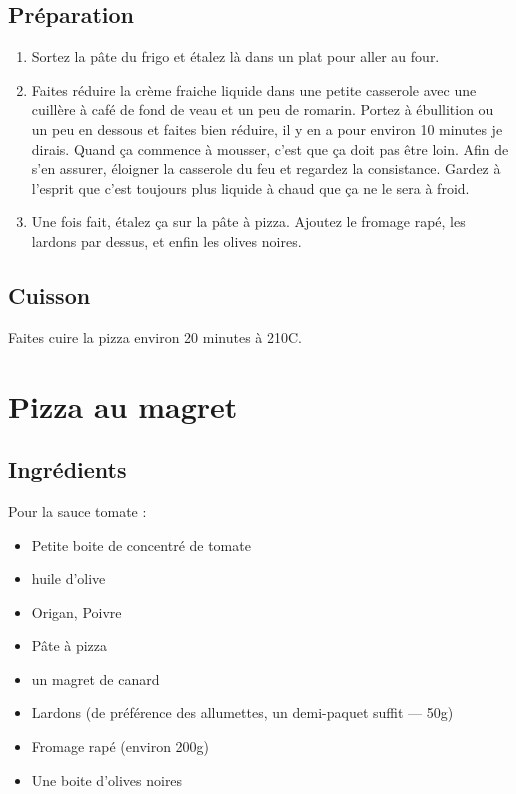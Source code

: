 \subsection*{Préparation}
\begin{enumerate}
\item Sortez la pâte du frigo et étalez là dans un plat pour aller au four.
\item Faites réduire la crème fraiche liquide dans une petite casserole avec une cuillère à café de fond de veau et un peu de romarin. Portez à ébullition ou un peu en dessous et faites bien réduire, il y en a pour environ 10 minutes je dirais. Quand ça commence à mousser, c'est que ça doit pas être loin. Afin de s'en assurer, éloigner la casserole du feu et regardez la consistance. Gardez à l'esprit que c'est toujours plus liquide à chaud que ça ne le sera à froid.
\item Une fois fait, étalez ça sur la pâte à pizza. Ajoutez le fromage rapé, les lardons par dessus, et enfin les olives noires.
\end{enumerate}

\subsection*{Cuisson}
Faites cuire la pizza environ 20 minutes à 210\degres C.

\newpage
\section{Pizza au magret}
\subsection*{Ingrédients}
Pour la sauce tomate :
\begin{itemize}
\item Petite boite de concentré de tomate
\item huile d'olive
\item Origan, Poivre
\end{itemize}

\begin{itemize}
\item Pâte à pizza
\item un magret de canard
\item Lardons (de préférence des allumettes, un demi-paquet suffit --- 50g)
\item Fromage rapé (environ 200g)
\item Une boite d'olives noires
\end{itemize}

